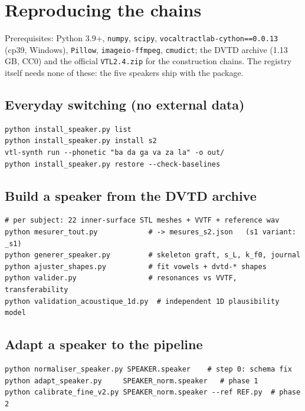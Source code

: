 \documentclass[11pt,a4paper]{article}
\newcommand{\code}[1]{\texttt{#1}}
\begin{document}
\section{Reproducing the chains}\label{sec:repro}

Prerequisites: Python 3.9+, \code{numpy}, \code{scipy},
\code{vocaltractlab-cython==0.0.13} (cp39, Windows), \code{Pillow},
\code{imageio-ffmpeg}, \code{cmudict}; the DVTD archive (1.13 GB,
CC0) and the official \code{VTL2.4.zip} for the construction chains.
The registry itself needs none of these: the five speakers ship with
the package.

\subsection{Everyday switching (no external data)}

\begin{lstlisting}[style=shell]
python install_speaker.py list
python install_speaker.py install s2
vtl-synth run --phonetic "ba da ga va za la" -o out/
python install_speaker.py restore --check-baselines
\end{lstlisting}

\subsection{Build a speaker from the DVTD archive}

\begin{lstlisting}[style=shell]
# per subject: 22 inner-surface STL meshes + VVTF + reference wav
python mesurer_tout.py            # -> mesures_s2.json   (s1 variant: _s1)
python generer_speaker.py         # skeleton graft, s_L, k_f0, journal
python ajuster_shapes.py          # fit vowels + dvtd-* shapes
python valider.py                 # resonances vs VVTF, transferability
python validation_acoustique_1d.py  # independent 1D plausibility model
\end{lstlisting}

\subsection{Adapt a speaker to the pipeline}

\begin{lstlisting}[style=shell]
python normaliser_speaker.py SPEAKER.speaker    # step 0: schema fix
python adapt_speaker.py     SPEAKER_norm.speaker   # phase 1
python calibrate_fine_v2.py SPEAKER_norm.speaker --ref REF.py  # phase 2
\end{lstlisting}
\end{document}
